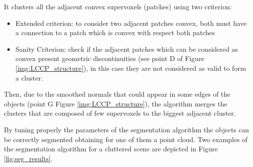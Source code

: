 It clusters all the adjacent convex supervoxels (patches) using two criterion:
\begin{itemize}
\item Extended criterion: to consider two adjacent patches convex, both must have a connection to a patch which is convex with respect both patches
\item Sanity Criterion: check if the adjacent patches which can be considered as convex present geometric discontinuities (see point D of Figure \ref{img:LCCP_structure}), in this case they are not considered as valid to form a cluster.
\end{itemize}
Then, due to the smoothed normals that could appear in some edges of the objects (point G Figure \ref{img:LCCP_structure}), the algorithm merges the clusters that are composed of few supervoxels to the biggest adjacent cluster. 

By tuning properly the parameters of the segmentation algorithm the objects can be correctly segmented obtaining for one of them a point cloud. Two examples of the segmentation algorithm for a cluttered scene are depicted in Figure \ref{fig:seg_results}.


